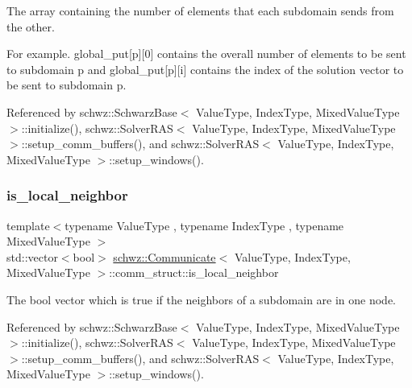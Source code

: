 The array containing the number of elements that each subdomain sends from the other. 

For example. global\+\_\+put\mbox{[}p\mbox{]}\mbox{[}0\mbox{]} contains the overall number of elements to be sent to subdomain p and global\+\_\+put\mbox{[}p\mbox{]}\mbox{[}i\mbox{]} contains the index of the solution vector to be sent to subdomain p. 

Referenced by schwz\+::\+Schwarz\+Base$<$ Value\+Type, Index\+Type, Mixed\+Value\+Type $>$\+::initialize(), schwz\+::\+Solver\+R\+A\+S$<$ Value\+Type, Index\+Type, Mixed\+Value\+Type $>$\+::setup\+\_\+comm\+\_\+buffers(), and schwz\+::\+Solver\+R\+A\+S$<$ Value\+Type, Index\+Type, Mixed\+Value\+Type $>$\+::setup\+\_\+windows().

\mbox{\label{structschwz_1_1Communicate_1_1comm__struct_ae36319cfa4fc09154135a2b121377d3b}} 
\subsubsection{\texorpdfstring{is\+\_\+local\+\_\+neighbor}{is\_local\_neighbor}}
{\footnotesize\ttfamily template$<$typename Value\+Type , typename Index\+Type , typename Mixed\+Value\+Type $>$ \\
std\+::vector$<$bool$>$ \hyperlink{classschwz_1_1Communicate}{schwz\+::\+Communicate}$<$ Value\+Type, Index\+Type, Mixed\+Value\+Type $>$\+::comm\+\_\+struct\+::is\+\_\+local\+\_\+neighbor}



The bool vector which is true if the neighbors of a subdomain are in one node. 



Referenced by schwz\+::\+Schwarz\+Base$<$ Value\+Type, Index\+Type, Mixed\+Value\+Type $>$\+::initialize(), schwz\+::\+Solver\+R\+A\+S$<$ Value\+Type, Index\+Type, Mixed\+Value\+Type $>$\+::setup\+\_\+comm\+\_\+buffers(), and schwz\+::\+Solver\+R\+A\+S$<$ Value\+Type, Index\+Type, Mixed\+Value\+Type $>$\+::setup\+\_\+windows().

\mbox{\label{structschwz_1_1Communicate_1_1comm__struct_ab4e91a457646f43106da98a58c332754}} 
